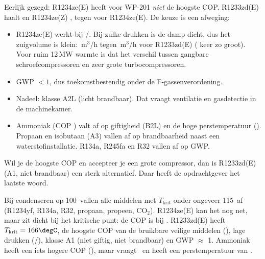 \begin{waarom}[R1234ze(E) voor WP-201]
Eerlijk gezegd: R1234ze(E) heeft voor WP-201 \emph{niet} de hoogste COP. R1233zd(E) haalt  en
R1234ze(Z) , tegen  voor R1234ze(E). De keuze is een afweging:
\begin{itemize}
\item R1234ze(E) werkt bij /\kPa. Bij zulke drukken is de damp dicht,
      dus het zuigvolume is klein: \,m$^3$/h tegen \,m$^3$/h voor
      R1233zd(E) ( keer zo groot). Voor ruim 12\,MW warmte is dat het verschil
      tussen gangbare schroefcompressoren en zeer grote turbocompressoren.
\item GWP $<1$, dus toekomstbestendig onder de F-gassenverordening.
\item Nadeel: klasse A2L (licht brandbaar). Dat vraagt ventilatie en gasdetectie in de machinekamer.
\item Ammoniak (COP ) valt af op giftigheid (B2L) en de hoge perstemperatuur
      (\degC). Propaan en isobutaan (A3) vallen af op brandbaarheid naast een
      waterstofinstallatie. R134a, R245fa en R32 vallen af op GWP.
\end{itemize}
Wil je de hoogste COP en accepteer je een grote compressor, dan is R1233zd(E) (A1, niet brandbaar) een sterk alternatief.
Daar heeft de opdrachtgever het laatste woord.
\end{waarom}
\begin{waarom}[R1233zd(E) voor WP-202]
Bij condenseren op 100\degC\ vallen alle middelen met $T_\mathrm{krit}$ onder ongeveer 115\degC\ af (R1234yf, R134a, R32, propaan,
propeen, CO$_2$). R1234ze(E) kan het nog net, maar zit dicht bij het kritische punt: de COP is 
bij \kPa. R1233zd(E) heeft $T_\mathrm{krit} = 166\degC$, de hoogste COP van de bruikbare
veilige middelen (), lage drukken (/\kPa),
klasse A1 (niet giftig, niet brandbaar) en GWP $\approx$ 1. Ammoniak heeft een iets hogere COP (),
maar vraagt \kPa\ en heeft een perstemperatuur van \degC.
\end{waarom}
